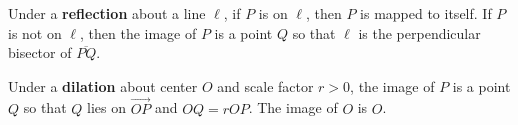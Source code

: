 \documentclass[nooutcomes]{ximera}
\begin{document}
\begin{question}
Under a \textbf{reflection} about a line $\ell$, if $P$ is on $\ell$, then $P$ is mapped to itself.  If $P$ is not on $\ell$, then the image of $P$ is a point $Q$ so that $\ell$ is the 
perpendicular bisector of $\overline{PQ}$.  
\end{question}

\begin{question}
Under a \textbf{dilation} about center $O$ and scale factor $r>0$, the image of $P$ is 
a point $Q$ so that $Q$ lies on $\overrightarrow{OP}$ and $OQ = rOP$.  The image of $O$ is $O$. 
\end{question}
\end{document}
